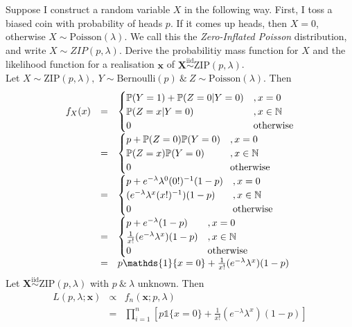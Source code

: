 \documentclass[11pt,a4paper]{article}
\begin{document}
\question
Suppose I construct a random variable $X$ in the following way. First, I toss a biased coin with probability of heads $p$. If it comes up heads, then $X=0$, otherwise $X\sim\mathrm{Poisson}(\lambda)$. We call this the \textit{Zero-Inflated Poisson} distribution, and write $X\sim ZIP(p,\lambda)$. Derive the probabilitiy mass function for $X$ and the likelihood function for a realisation $\textbf{x}$ of $\textbf{X}\overset{\mathrm{iid}}{\sim}\mathrm{ZIP}(p,\lambda)$.\\

\ans
Let $X\sim\mathrm{ZIP}(p,\lambda),\ Y\sim\mathrm{Bernoulli}(p)\ \&\ Z\sim\mathrm{Poisson}(\lambda)$. Then
\[\begin{array}{rcl}
f_X(x)&=&\begin{cases}
\prob(Y=1)+\prob(Z=0|Y=0)&, x=0\\
\prob(Z=x|Y=0)&, x\in\nats\\
0&\mathrm{otherwise}
\end{cases}\\
&=&\begin{cases}
p+\prob(Z=0)\prob(Y=0)&, x=0\\
\prob(Z=x)\prob(Y=0)&, x\in\nats\\
0&\mathrm{otherwise}
\end{cases}\\
&=&\begin{cases}
p+e^{-\lambda}\lambda^0(0!)^{-1}(1-p)&, x=0\\
(e^{-\lambda}\lambda^x(x!)^{-1})(1-p)&, x\in\nats\\
0&\mathrm{otherwise}
\end{cases}\\
&=&\begin{cases}
p+e^{-\lambda}(1-p)&, x=0\\
\frac{1}{x!}(e^{-\lambda}\lambda^x)(1-p)&, x\in\nats\\
0&\mathrm{otherwise}
\end{cases}\\
&=&p\mathds{1}\{x=0\}+\frac{1}{x!}(e^{-\lambda}\lambda^x)(1-p)
\end{array}\]
Let $\textbf{X}\overset{\mathrm{iid}}{\sim}\mathrm{ZIP}(p,\lambda)$ with $p\ \&\ \lambda$ unknown. Then
\[\begin{array}{rcl}
L(p,\lambda;\textbf{x})&\propto&f_n(\textbf{x};p,\lambda)\\
&=&\prod\limits_{i=1}^n\left[p\mathds{1}\{x=0\}+\frac{1}{x!}(e^{-\lambda}\lambda^x)(1-p)\right]
\end{array}\]
\end{document}
